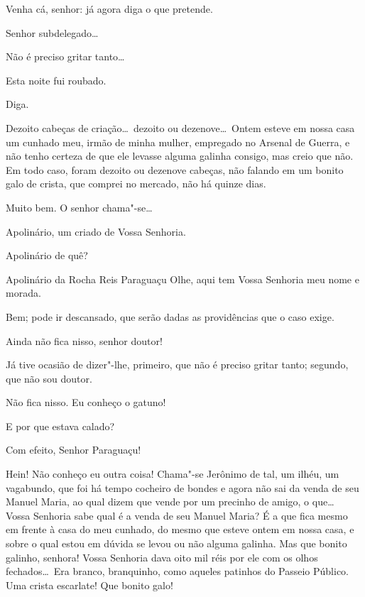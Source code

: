  Venha cá, senhor: já agora diga o que pretende.

   Senhor subdelegado\ldots

 Não é preciso gritar tanto\ldots

 Esta noite fui roubado.

 Diga.

 Dezoito cabeças de criação\ldots\ dezoito ou dezenove\ldots\ Ontem
esteve em nossa casa um cunhado
meu, irmão de minha mulher, empregado no Arsenal de Guerra, e não tenho
certeza de que ele levasse alguma
galinha consigo, mas creio que não. Em todo caso, foram dezoito ou
dezenove cabeças, não falando em um
bonito galo de crista, que comprei no mercado, não há quinze dias.

 Muito bem. O senhor chama"-se\ldots

 Apolinário, um criado de Vossa Senhoria.

 Apolinário de quê?

 Apolinário da Rocha Reis Paraguaçu  Olhe, aqui tem Vossa Senhoria meu
nome e morada.

 Bem; pode ir descansado, que serão dadas as providências que o
caso exige.

  Ainda não fica nisso,
senhor doutor!

 Já tive ocasião de dizer"-lhe, primeiro, que não é preciso
gritar tanto; segundo, que não sou doutor.

  Não fica
nisso. Eu conheço o gatuno!

 E por que estava calado?

  Com efeito, Senhor
Paraguaçu!

  Hein!  Não conheço eu outra coisa!
Chama"-se Jerônimo de tal, um ilhéu, um vagabundo, que foi há tempo
cocheiro de bondes e agora não sai da
venda de seu Manuel Maria, ao qual dizem que vende por um precinho de
amigo, o que\ldots\ 
Vossa Senhoria sabe qual é a venda de seu Manuel Maria? É a que fica
mesmo em frente à casa do meu
cunhado, do mesmo que esteve ontem em nossa casa, e sobre o qual estou
em dúvida se levou ou não alguma
galinha.  Mas que bonito galinho, senhora! Vossa
Senhoria dava oito mil réis por ele com os olhos
fechados\ldots\ Era branco, branquinho, como aqueles patinhos do Passeio
Público. Uma crista escarlate! Que
bonito galo!

